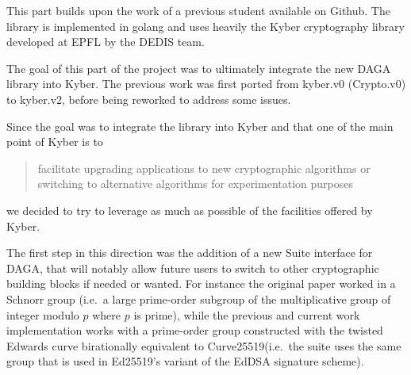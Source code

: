    
    This part builds upon the work of a previous student available on Github.
    The library is implemented in golang and uses heavily the Kyber
    cryptography library developed at EPFL by the DEDIS team.\newline

    The goal of this part of the project was to ultimately integrate the new DAGA library into Kyber.
    The previous work was first ported from kyber.v0 (Crypto.v0) to kyber.v2, before being reworked to address some issues.\medskip

    Since the goal was to integrate the library into Kyber and that one of the main point of Kyber is to \blockquote{
    facilitate upgrading applications to new cryptographic algorithms or switching to alternative algorithms
    for experimentation purposes}\footnotemark[\thefootnote]
    we decided to try to leverage as much as possible of the facilities offered by Kyber.

    The first step in this direction was the addition of a new Suite interface for DAGA, that will notably allow future users to switch to other cryptographic building blocks if needed or wanted.
    For instance the original paper  worked in a Schnorr group (i.e.\ a large prime-order subgroup of the multiplicative group of integer modulo \(p\) where \(p\) is prime),
    while the previous and current work implementation works with a prime-order group constructed with the twisted Edwards curve birationally equivalent to
    Curve25519\cite{yung_curve25519:_2006}(i.e.\ the suite uses the same group that is used in Ed25519's variant of the EdDSA signature scheme).

